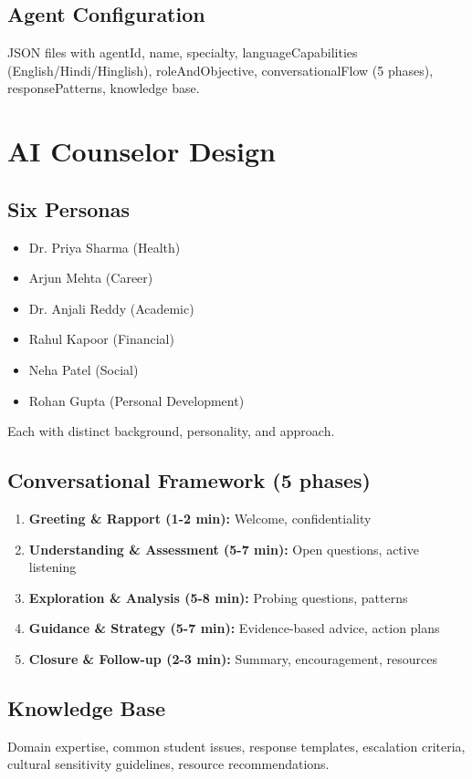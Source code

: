 \documentclass[11pt,a4paper]{report}
\begin{document}
\subsection{Agent Configuration}
JSON files with agentId, name, specialty, languageCapabilities (English/Hindi/Hinglish), roleAndObjective, conversationalFlow (5 phases), responsePatterns, knowledge base.

\section{AI Counselor Design}

\subsection{Six Personas}
\begin{itemize}
    \item Dr. Priya Sharma (Health)
    \item Arjun Mehta (Career)
    \item Dr. Anjali Reddy (Academic)
    \item Rahul Kapoor (Financial)
    \item Neha Patel (Social)
    \item Rohan Gupta (Personal Development)
\end{itemize}

Each with distinct background, personality, and approach.

\subsection{Conversational Framework (5 phases)}
\begin{enumerate}
    \item \textbf{Greeting \& Rapport (1-2 min):} Welcome, confidentiality
    \item \textbf{Understanding \& Assessment (5-7 min):} Open questions, active listening
    \item \textbf{Exploration \& Analysis (5-8 min):} Probing questions, patterns
    \item \textbf{Guidance \& Strategy (5-7 min):} Evidence-based advice, action plans
    \item \textbf{Closure \& Follow-up (2-3 min):} Summary, encouragement, resources
\end{enumerate}

\subsection{Knowledge Base}
Domain expertise, common student issues, response templates, escalation criteria, cultural sensitivity guidelines, resource recommendations.
\end{document}
